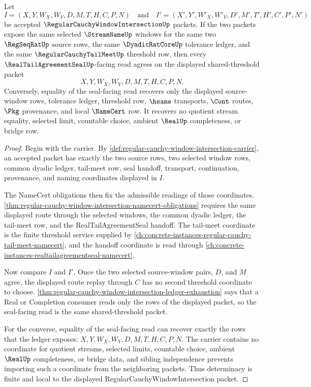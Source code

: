 \begin{theorem}
\label{thm:regular-cauchy-window-intersection-shared-threshold-determinacy}
Let
$$
I=(X,Y,W_X,W_Y,D,M,T,H,C,P,N)
\quad\text{and}\quad
I'=(X',Y',W'_X,W'_Y,D',M',T',H',C',P',N')
$$
be accepted $\RegularCauchyWindowIntersectionUp$ packets. If the two packets expose the same selected $\StreamNameUp$ windows for the same two $\RegSeqRatUp$ source rows, the same $\DyadicRatCoreUp$ tolerance ledger, and the same $\RegularCauchyTailMeetUp$ threshold row, then every $\RealTailAgreementSealUp$-facing read agrees on the displayed shared-threshold packet
$$
X,Y,W_X,W_Y,D,M,T,H,C,P,N.
$$
Conversely, equality of the seal-facing read recovers only the displayed source-window rows, tolerance ledger, threshold row, $\hsame$ transports, $\Cont$ routes, $\Pkg$ provenance, and local $\NameCert$ row. It recovers no quotient stream equality, selected limit, countable choice, ambient $\RealUp$ completeness, or bridge row.
\end{theorem}
\begin{proof}
Begin with the carrier. By \autoref{def:regular-cauchy-window-intersection-carrier}, an accepted packet has exactly the two source rows, two selected window rows, common dyadic ledger, tail-meet row, seal handoff, transport, continuation, provenance, and naming coordinates displayed in $I$.

The NameCert obligations then fix the admissible readings of those coordinates. \autoref{thm:regular-cauchy-window-intersection-namecert-obligations} requires the same displayed route through the selected windows, the common dyadic ledger, the tail-meet row, and the RealTailAgreementSeal handoff. The tail-meet coordinate is the finite threshold service supplied by \autoref{ch:concrete-instances-regular-cauchy-tail-meet-namecert}, and the handoff coordinate is read through \autoref{ch:concrete-instances-realtailagreementseal-namecert}.

Now compare $I$ and $I'$. Once the two selected source-window pairs, $D$, and $M$ agree, the displayed route replay through $C$ has no second threshold coordinate to choose. \autoref{thm:regular-cauchy-window-intersection-ledger-exhaustion} says that a Real or Completion consumer reads only the rows of the displayed packet, so the seal-facing read is the same shared-threshold packet.

For the converse, equality of the seal-facing read can recover exactly the rows that the ledger exposes: $X,Y,W_X,W_Y,D,M,T,H,C,P,N$. The carrier contains no coordinate for quotient streams, selected limits, countable choice, ambient $\RealUp$ completeness, or bridge data, and sibling independence prevents importing such a coordinate from the neighboring packets. Thus determinacy is finite and local to the displayed RegularCauchyWindowIntersection packet.
\end{proof}

